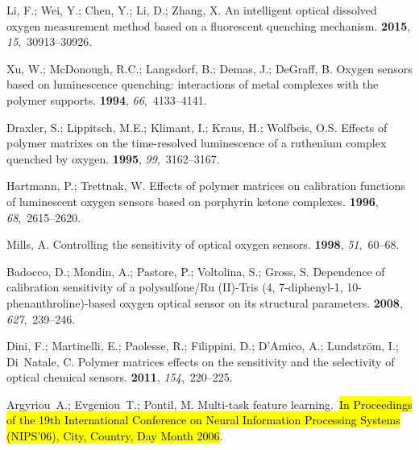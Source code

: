 \documentclass[sensors,article,accept,moreauthors,pdftex,10pt,a4paper]{Definitions/mdpi}
\begin{document}
\begin{thebibliography}{999}
Li, F.; Wei, Y.; Chen, Y.; Li, D.; Zhang, X.
\newblock An intelligent optical dissolved oxygen measurement method based on a
  fluorescent quenching mechanism.
 {\bf 2015}, {\em 15},~30913--30926.

Xu, W.; McDonough, R.C.; Langsdorf, B.; Demas, J.; DeGraff, B.
\newblock Oxygen sensors based on luminescence quenching: interactions of metal
  complexes with the polymer supports.
 {\bf 1994}, {\em 66},~4133--4141.

Draxler, S.; Lippitsch, M.E.; Klimant, I.; Kraus, H.; Wolfbeis, O.S.
\newblock Effects of polymer matrixes on the time-resolved luminescence of a
  ruthenium complex quenched by oxygen.
 {\bf 1995}, {\em
  99},~3162--3167.

Hartmann, P.; Trettnak, W.
\newblock Effects of polymer matrices on calibration functions of luminescent
  oxygen sensors based on porphyrin ketone complexes.
 {\bf 1996}, {\em 68},~2615--2620.

Mills, A.
\newblock Controlling the sensitivity of optical oxygen sensors.
 {\bf 1998}, {\em 51},~60--68.

Badocco, D.; Mondin, A.; Pastore, P.; Voltolina, S.; Gross, S.
\newblock Dependence of calibration sensitivity of a polysulfone/Ru (II)-Tris
  (4, 7-diphenyl-1, 10-phenanthroline)-based oxygen optical sensor on its
  structural parameters.
 {\bf 2008}, {\em 627},~239--246.

Dini, F.; Martinelli, E.; Paolesse, R.; Filippini, D.; D’Amico, A.;
  Lundstr{\"o}m, I.; Di~Natale, C.
\newblock Polymer matrices effects on the sensitivity and the selectivity of
  optical chemical sensors.
 {\bf 2011}, {\em
  154},~220--225.

Argyriou~A.; Evgeniou~T.; Pontil, M.
\newblock Multi-task feature learning.~\newblock \hl{In Proceedings of the 19th International Conference on Neural
  Information Processing Systems (NIPS'06), City, Country, Day Month 2006}. %


\end{thebibliography}
\end{document}
